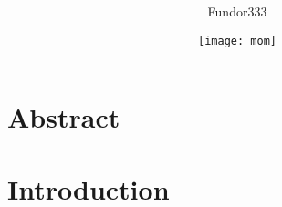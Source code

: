 \documentclass[a4paper]{article}
\title{\center{\texttt{[image: logo]}}\\ \texttitle}
\author{\normalsize Fundor333 }
\date{\texttt{[image: mom]}}
\begin{document}
\pagestyle{generic}

\maketitle
\noindent{\color[HTML]{8d0801} \rule{\textwidth}{1pt}}

\section{Abstract}

\lipsum[1-4]\autocite{tanenbaum2013fondamenti}

\section{Introduction}

\lipsum[5-12]

\printbibliography
\end{document}
